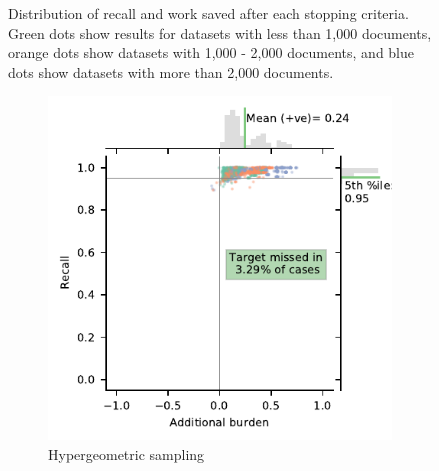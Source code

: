\documentclass{bmcart}
\begin{document}
\begin{figure}
	\caption{\small Distribution of recall and work saved after each stopping criteria. Green dots show results for datasets with less than 1,000 documents, orange dots show datasets with 1,000 - 2,000 documents, and blue dots show datasets with more than 2,000 documents.} 
	\label{recall-wss}
\end{figure}

\begin{figure}
	\centering
		\begin{subfigure}[b]{0.475\textwidth}   
		\centering 
		\includegraphics[width=\textwidth]{../images/jointplot_burden_hyper}
		\caption[]%
		{{\small Hypergeometric sampling \\}}    
		\label{fig:hyper_ab}
	\end{subfigure}
	\hfill
	\begin{subfigure}[b]{0.475\textwidth}   
		\centering 

\end{subfigure}
\end{figure}
\end{document}
